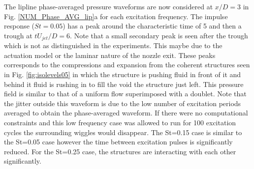 \documentclass[english]{aiaa-tc}
\begin{document}
The lipline phase-averaged pressure waveforms are now considered at $x/D=3$ in Fig. \ref{NUM_Phase_AVG_lip}a for each excitation frequency. The impulse response ($St=0.05$) has a peak around the characteristic time of 5 and then a trough at $tU_{jet}/D=6$. Note that a small secondary peak is seen after the trough which is not as distinguished in the experiments. This maybe due to the actuation model or the laminar nature of the nozzle exit.
These peaks corresponds to the compressions and expansion from the coherent structures seen in Fig. \ref{fig:isolevels05} in which the structure is pushing fluid in front of it and behind it fluid is rushing in to fill the void the structure just left. This pressure field is similar to that of a uniform flow superimposed with a doublet. Note that the jitter outside this waveform is due to the low number of excitation periods averaged to obtain the phase-averaged waveform. If there were no computational constraints and this low frequency case was allowed to run for 100 excitation cycles the surrounding wiggles would disappear. The St=0.15 case is similar to  the St=0.05 case however the time between excitation pulses is significantly reduced. For the St=0.25 case, the structures are interacting with each other significantly.
\end{document}
